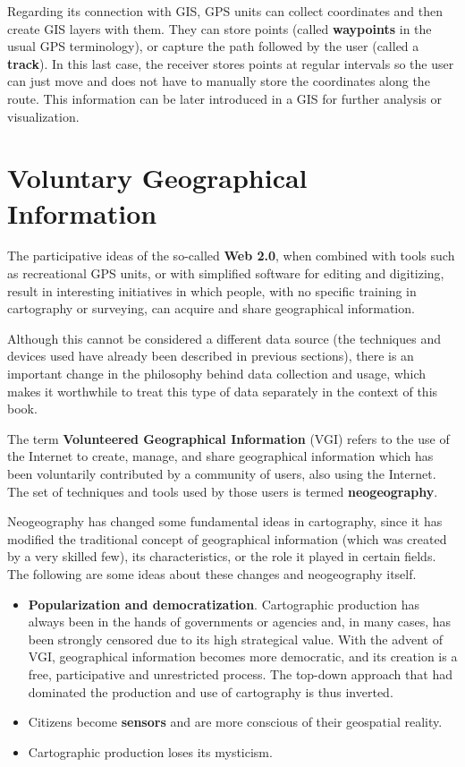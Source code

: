 Regarding its connection with GIS, GPS units can collect coordinates and then create GIS layers with them. They can store points (called \textbf{waypoints} in the usual GPS terminology), or capture the path followed by the user (called a \textbf{track}). In this last case, the receiver stores points at regular intervals so the user can just move and does not have to manually store the coordinates along the route. This information can be later introduced in a GIS for further analysis or visualization. 


\section{Voluntary Geographical Information}

The participative ideas of the so-called \textbf{Web 2.0}, when combined with tools such as recreational GPS units, or with simplified software for editing and digitizing, result in interesting initiatives in which people, with no specific training in cartography or surveying, can acquire and share geographical information. 

Although this cannot be considered a different data source (the techniques and devices used have already been described in previous sections), there is an important change in the philosophy behind data collection and usage, which makes it worthwhile to treat this type of data separately in the context of this book.

The term \textbf{Volunteered Geographical Information} (VGI) refers to the use of the Internet to create, manage, and share geographical information which has been voluntarily contributed by a community of users, also using the Internet. The set of techniques and tools used by those users is termed \textbf{neogeography}. 

Neogeography has changed some fundamental ideas in cartography, since it has modified the traditional concept of geographical information (which was created by a very skilled few), its characteristics, or the role it played in certain fields. The following are some ideas about these changes and neogeography itself.


\begin{itemize}
	\item \textbf{Popularization and democratization}. Cartographic production has always been in the hands of governments or agencies and, in many cases, has been strongly censored due to its high strategical value. With the advent of VGI, geographical information becomes more democratic, and its creation is a free, participative and unrestricted process. The top-down approach that had dominated the production and use of cartography is thus inverted.
	\item Citizens become \textbf{sensors} and are more conscious of their geospatial reality.
	\item Cartographic production loses its mysticism.	
\end{itemize}


